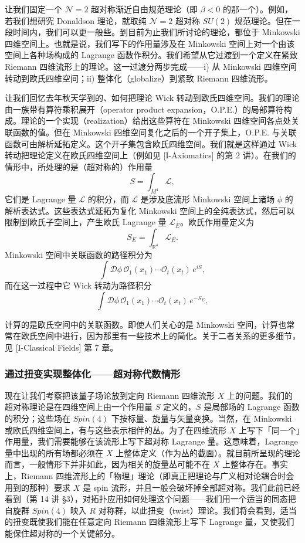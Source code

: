 让我们固定一个 $\mathcal{N}=2$ 超对称渐近自由规范理论（即 $\beta<0$ 的那一个）。例如，若我们想研究 Donaldson 理论，就取纯 $\mathcal{N}=2$ 超对称 $SU(2)$ 规范理论。但在一段时间内，我们可以更一般些。到目前为止我们所讨论的理论，都位于 Minkowski 四维空间上。也就是说，我们写下的作用量涉及在 Minkowski 空间上对一个由该空间上各种场构成的 Lagrange 函数作积分。我们希望从它过渡到一个定义在紧致 Riemann 四维流形上的理论。这一过渡分两步完成——i) 从 Minkowski 四维空间转动到欧氏四维空间；ii) 整体化（globalize）到紧致 Riemann 四维流形。

让我们回忆去年秋天学到的、如何把理论 Wick 转动到欧氏四维空间。我们的理论由一族带有算符乘积展开（operator product expansion，O.P.E.）的局部算符构成。理论的一个实现（realization）给出这些算符在 Minkowski 四维空间各点处关联函数的值。但在 Minkowski 四维空间复化之后的一个开子集上，O.P.E. 与关联函数可由解析延拓定义。这个开子集包含欧氏四维空间。我们就是这样通过 Wick 转动把理论定义在欧氏四维空间上（例如见 [I-Axiomatics] 的第 2 讲）。在我们的情形中，所处理的是（超对称的）作用量
\[
S=\int_{M^4}\mathcal{L},
\]
它们是 Lagrange 量 $\mathcal{L}$ 的积分，而 $\mathcal{L}$ 是涉及底流形 Minkowski 空间上诸场 $\phi$ 的解析表达式。这些表达式延拓为复化 Minkowski 空间上的全纯表达式，然后可以限制到欧氏子空间上，产生欧氏 Lagrange 量 $\mathcal{L}_E$。欧氏作用量定义为
\[
S_E=\int_{\mathbb{R}^4}\mathcal{L}_E.
\]
Minkowski 空间中关联函数的路径积分为
\[
\int\mathcal{D}\phi\,\mathcal{O}_1(x_1)\cdots\mathcal{O}_t(x_t)\,e^{iS},
\]
而在这一过程中它 Wick 转动为路径积分
\[
\int\mathcal{D}\phi\,\mathcal{O}_1(x_1)\cdots\mathcal{O}_t(x_t)\,e^{-S_E},
\]

计算的是欧氏空间中的关联函数。即使人们关心的是 Minkowski 空间，计算也常常在欧氏空间中进行，因为那里有一些技术上的简化。关于二者关系的更多细节，见 [I-Classical Fields] 第 7 章。

\subsubsection{通过扭变实现整体化——超对称代数情形}

现在让我们考察把该量子场论放到定向 Riemann 四维流形 $X$ 上的问题。我们的超对称理论是在四维空间上由一个作用量 $S$ 定义的，$S$ 是局部场的 Lagrange 函数的积分；这些场在 $Spin(4)$ 下按标量、旋量与矢量变换。当然，在 Minkowski 或欧氏四维空间上，有与这些表示相伴的丛。为了在四维流形 $X$ 上写下「同一个」作用量，我们需要能够在该流形上写下超对称 Lagrange 量。这意味着，Lagrange 量中出现的所有场都必须在 $X$ 上整体定义（作为丛的截面）。就目前所呈现的理论而言，一般情形下并非如此，因为相关的旋量丛可能不在 $X$ 上整体存在。事实上，Riemann 四维流形上的「物理」理论（即真正把理论与广义相对论耦合时会用到的那种）要求 $X$ 是 spin 流形，并且一般会破坏掉全部超对称。我们此前已经看到（第 14 讲 §3），对拓扑应用如何处理这个问题——我们用一个适当的同态把自旋群 $Spin(4)$ 映入 $R$ 对称群，以此扭变（twist）理论。我们将会看到，适当的扭变既使我们能在任意定向 Riemann 四维流形上写下 Lagrange 量，又使我们能保住超对称的一个关键部分。


